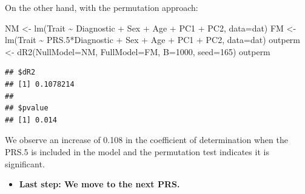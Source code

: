 \documentclass[
]{article}
\newenvironment{Shaded}{\begin{snugshade}}{\end{snugshade}}
\newcommand{\AttributeTok}[1]{\textcolor[rgb]{0.77,0.63,0.00}{#1}}
\newcommand{\DecValTok}[1]{\textcolor[rgb]{0.00,0.00,0.81}{#1}}
\newcommand{\FloatTok}[1]{\textcolor[rgb]{0.00,0.00,0.81}{#1}}
\newcommand{\FunctionTok}[1]{\textcolor[rgb]{0.00,0.00,0.00}{#1}}
\newcommand{\NormalTok}[1]{#1}
\newcommand{\OtherTok}[1]{\textcolor[rgb]{0.56,0.35,0.01}{#1}}
\newcommand{\SpecialCharTok}[1]{\textcolor[rgb]{0.00,0.00,0.00}{#1}}
\providecommand{\tightlist}{%
  \setlength{\itemsep}{0pt}\setlength{\parskip}{0pt}}
\begin{document}
\bigskip

On the other hand, with the permutation approach:

\begin{Shaded}
\begin{Highlighting}[]
\NormalTok{NM }\OtherTok{\textless{}{-}} \FunctionTok{lm}\NormalTok{(Trait }\SpecialCharTok{\textasciitilde{}}\NormalTok{ Diagnostic }\SpecialCharTok{+}\NormalTok{ Sex }\SpecialCharTok{+}\NormalTok{ Age }\SpecialCharTok{+}\NormalTok{ PC1 }\SpecialCharTok{+}\NormalTok{ PC2, }\AttributeTok{data=}\NormalTok{dat)}
\NormalTok{FM }\OtherTok{\textless{}{-}} \FunctionTok{lm}\NormalTok{(Trait }\SpecialCharTok{\textasciitilde{}}\NormalTok{ PRS}\FloatTok{.5}\SpecialCharTok{*}\NormalTok{Diagnostic }\SpecialCharTok{+}\NormalTok{ Sex }\SpecialCharTok{+}\NormalTok{ Age }\SpecialCharTok{+}\NormalTok{ PC1 }\SpecialCharTok{+}\NormalTok{ PC2, }\AttributeTok{data=}\NormalTok{dat)}
\NormalTok{outperm }\OtherTok{\textless{}{-}} \FunctionTok{dR2}\NormalTok{(}\AttributeTok{NullModel=}\NormalTok{NM, }\AttributeTok{FullModel=}\NormalTok{FM, }\AttributeTok{B=}\DecValTok{1000}\NormalTok{, }\AttributeTok{seed=}\DecValTok{165}\NormalTok{)}
\NormalTok{outperm}
\end{Highlighting}
\end{Shaded}

\begin{verbatim}
## $dR2
## [1] 0.1078214
## 
## $pvalue
## [1] 0.014
\end{verbatim}

We observe an increase of 0.108 in the coefficient of determination when
the PRS.5 is included in the model and the permutation test indicates it
is significant.

\begin{itemize}
\tightlist
\item
  \textbf{Last step: We move to the next PRS.}
\end{itemize}
\end{document}
